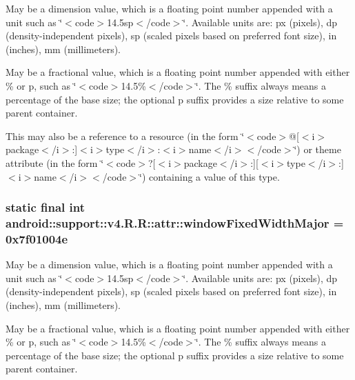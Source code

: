 May be a dimension value, which is a floating point number appended with a unit such as \char`\"{}$<$code$>$14.5sp$<$/code$>$\char`\"{}. Available units are: px (pixels), dp (density-independent pixels), sp (scaled pixels based on preferred font size), in (inches), mm (millimeters). 

May be a fractional value, which is a floating point number appended with either \% or p, such as \char`\"{}$<$code$>$14.5\%$<$/code$>$\char`\"{}. The \% suffix always means a percentage of the base size; the optional p suffix provides a size relative to some parent container. 

This may also be a reference to a resource (in the form \char`\"{}$<$code$>$@\mbox{[}$<$i$>$package$<$/i$>$:\mbox{]}$<$i$>$type$<$/i$>$:$<$i$>$name$<$/i$>$$<$/code$>$\char`\"{}) or theme attribute (in the form \char`\"{}$<$code$>$?\mbox{[}$<$i$>$package$<$/i$>$:\mbox{]}\mbox{[}$<$i$>$type$<$/i$>$:\mbox{]}$<$i$>$name$<$/i$>$$<$/code$>$\char`\"{}) containing a value of this type. \hypertarget{classandroid_1_1support_1_1v4_1_1_r_1_1attr_97e6892fb2397919e01eeea68749f138}{
\subsubsection[{windowFixedWidthMajor}]{\setlength{\rightskip}{0pt plus 5cm}static final int android::support::v4.R.R::attr::windowFixedWidthMajor = 0x7f01004e}}
\label{classandroid_1_1support_1_1v4_1_1_r_1_1attr_97e6892fb2397919e01eeea68749f138}


May be a dimension value, which is a floating point number appended with a unit such as \char`\"{}$<$code$>$14.5sp$<$/code$>$\char`\"{}. Available units are: px (pixels), dp (density-independent pixels), sp (scaled pixels based on preferred font size), in (inches), mm (millimeters). 

May be a fractional value, which is a floating point number appended with either \% or p, such as \char`\"{}$<$code$>$14.5\%$<$/code$>$\char`\"{}. The \% suffix always means a percentage of the base size; the optional p suffix provides a size relative to some parent container. 

